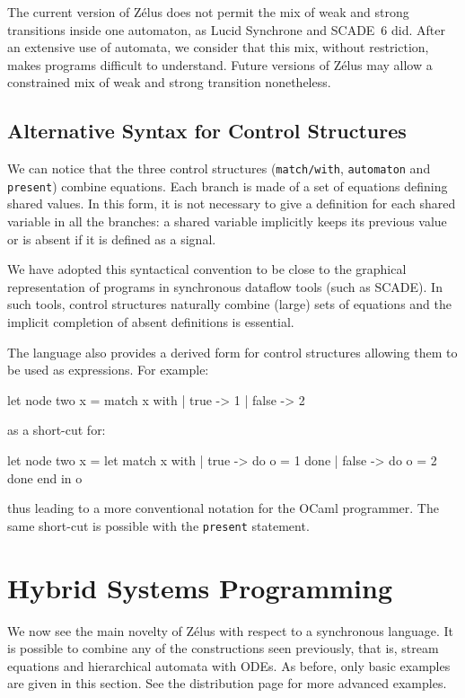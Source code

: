 \documentclass[11pt,titlepage,twoside]{report}
\newcommand{\zelus}{{\sf Z\'elus}}
\newcommand{\lucy}{{\sf Lucid Synchrone}}
\newcommand{\scade}{{\sf SCADE}}
\newcommand{\scadesix}{{\sf SCADE~6}}
\newcommand{\ocaml}{{\sf OCaml}}
\newcommand{\Remark}{\medskip\noindent{\bf Remark: }}
\begin{document}
\Remark The current version of \zelus{} does not permit the mix of
weak and strong transitions inside one automaton, as \lucy{} and
\scadesix{} did. After an extensive use of automata, we consider that
this mix, without restriction, makes programs difficult to
understand. Future versions of \zelus{} may allow a constrained mix of
weak and strong transition nonetheless.

\section{Alternative Syntax for Control Structures\label{altcontrol}} %

We can notice that the three control structures (\verb+match/with+,
\verb-automaton- and \verb-present-) combine equations. Each branch is
made of a set of equations defining shared values. In this form, it
is not necessary to give a definition for each shared variable in all the
branches: a shared variable implicitly keeps its previous value or
is absent if it is defined as a signal.

We have adopted this syntactical convention to be close to the graphical
representation of programs in synchronous dataflow tools (such as
\scade). In such tools, control structures naturally combine (large) sets of
equations and the implicit completion of absent definitions is
essential.

The language also provides a derived form for control structures
allowing them to be used as expressions. For example:
%
\begin{chklisting}
let node two x =
  match x with | true -> 1 | false -> 2
\end{chklisting}
%
as a short-cut for:
\begin{chklisting}
let node two x =
  let match x with
     |  true -> do o = 1 done
     | false -> do o = 2 done
     end in
  o
\end{chklisting}
%
thus leading to a more conventional notation for the \ocaml{}
programmer. The same short-cut is possible with the \verb-present- statement.



\chapter{Hybrid Systems Programming\label{ode-programming}} %

We now see the main novelty of \zelus{} with respect to a
synchronous language. It is possible to combine any of the
constructions seen previously, that is, stream equations and hierarchical
automata with ODEs. As before, only
basic examples are given in this section. See the distribution page for
more advanced examples.
\end{document}
